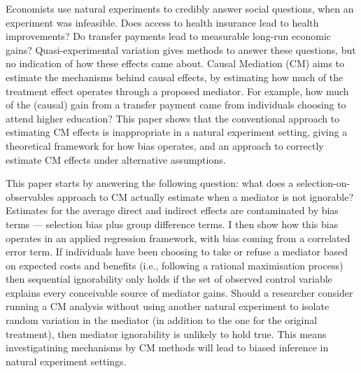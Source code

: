 Economists use natural experiments to credibly answer social questions, when an experiment was infeasible.
Does access to health insurance lead to health improvements?
Do transfer payments  lead to measurable long-run economic gains?
Quasi-experimental variation gives methods to answer these questions, but no indication of how these effects came about.
Causal Mediation (CM) aims to estimate the mechanisms behind causal effects, by estimating how much of the treatment effect operates through a proposed mediator.
For example, how much of the (causal) gain from a transfer payment came from individuals choosing to attend higher education?
This paper shows that the conventional approach to estimating CM effects is inappropriate in a natural experiment setting, giving a theoretical framework for how bias operates, and an approach to correctly estimate CM effects under alternative assumptions.

This paper starts by answering the following question: what does a selection-on-observables approach to CM actually estimate when a mediator is not ignorable?
Estimates for the average direct and indirect effects are contaminated by bias terms --- selection bias plus group difference terms.
I then show how this bias operates in an applied regression framework, with bias coming from a correlated error term.
If individuals have been choosing to take or refuse a mediator based on expected costs and benefits (i.e., following a rational maximisation process) then sequential ignorability only holds if the set of observed control variable explains every conceivable source of mediator gains.
Should a researcher consider running a CM analysis without using another natural experiment to isolate random variation in the mediator (in addition to the one for the original treatment), then mediator ignorability is unlikely to hold true.
This means investigatining mechanisms by CM methods will lead to biased inference in natural experiment settings.


